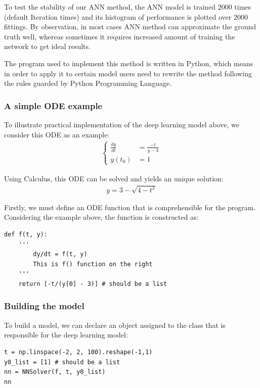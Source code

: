 \documentclass[a4paper]{article}
\numberwithin{equation}{section}
\begin{document}
To test the stability of our ANN method, the ANN model is trained 2000 times (default Iteration times) and its histogram of performance is plotted over 2000 fittings. By observation, in most cases ANN method can approximate the ground truth well, whereas sometimes it requires increased amount of training the network to get ideal results.

The program used to implement this method is written in Python, which means in order to apply it to certain model users need to rewrite the method following the rules guarded by Python Programming Language.

\subsubsection{A simple ODE example}
To illustrate practical implementation of the deep learning model above, we consider this ODE as an example:
\begin{align*}
  \begin{cases}
    \frac{dy}{dt} & = \frac{-t}{y - 3} \\
    y(t_0)        & = 1
  \end{cases}
\end{align*}

Using Calculus, this ODE can be solved and yields an unique solution:
\begin{align}
  y = 3 - \sqrt{4-t^2}
\end{align}

Firstly, we must define an ODE function that is comprehensible for the program. Considering the example above, the function is constructed as:
\begin{mdframed}[leftline=false,rightline=false,backgroundcolor=magenta!10,nobreak=true]
  \begin{verbatim}
def f(t, y):
    '''
        dy/dt = f(t, y)
        This is f() function on the right
    '''
    return [-t/(y[0] - 3)] # should be a list
  \end{verbatim}
\end{mdframed}

\subsubsection{Building the model}
To build a model, we can declare an object assigned to the class that is responsible for the deep learning model:
\begin{mdframed}[leftline=false,rightline=false,backgroundcolor=magenta!10,nobreak=true]
  \begin{verbatim}
t = np.linspace(-2, 2, 100).reshape(-1,1)
y0_list = [1] # should be a list
nn = NNSolver(f, t, y0_list)
nn
  \end{verbatim}
\end{mdframed}
\end{document}
